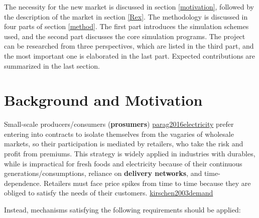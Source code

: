 \documentclass[letterpaper,8pt,twocolumn,twoside,]{pinp}
\begin{document}
The necessity for the new market is discussed in section
\ref{motivation}, followed by the description of the market in section
\ref{Rex}. The methodology is discussed in four parts of section
\ref{method}. The first part introduces the simulation schemes used, and
the second part discusses the core simulation programs. The project can
be researched from three perspectives, which are listed in the third
part, and the most important one is elaborated in the last part.
Expected contributions are summarized in the last section.

\hypertarget{background-and-motivation}{%
\section{Background and Motivation}\label{background-and-motivation}}

\label{motivation}

Small-scale producers/consumers (\textbf{prosumers})
\protect\hyperlink{reference}{parag2016electricity} prefer entering into
contracts to isolate themselves from the vagaries of wholesale markets,
so their participation is mediated by retailers, who take the risk and
profit from premiums. This strategy is widely applied in industries with
durables, while is impractical for fresh foods and electricity because
of their continuous generations/consumptions, reliance on
\textbf{delivery networks}, and time-dependence. Retailers must face
price spikes from time to time because they are obliged to satisfy the
needs of their customers.
\protect\hyperlink{reference}{kirschen2003demand}

Instead, mechanisms satisfying the following requirements should be
applied:
\end{document}

